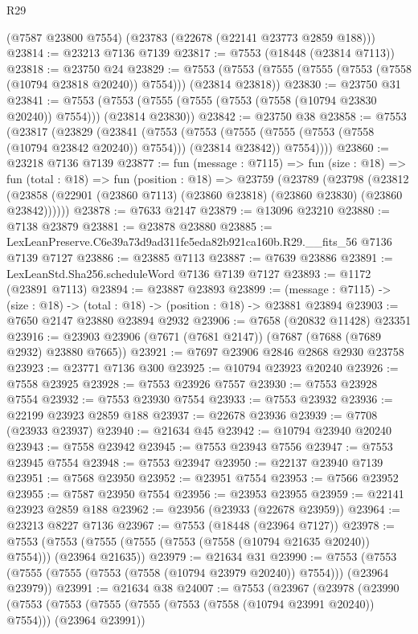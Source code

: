 \begin{lexlean}{R29}
\begin{coremodule}
    (@7587 @23800 @7554)
    (@23783 (@22678 (@22141 @23773 @2859 @188)))
@23814 := @23213 @7136 @7139
@23817 := @7553 (@18448 (@23814 @7113))
@23818 := @23750 @24
@23829 := @7553 (@7553 (@7555 (@7555 (@7553 (@7558 (@10794 @23818 @20240)) @7554))) (@23814 @23818))
@23830 := @23750 @31
@23841 := @7553 (@7553 (@7555 (@7555 (@7553 (@7558 (@10794 @23830 @20240)) @7554))) (@23814 @23830))
@23842 := @23750 @38
@23858 := @7553
    (@23817
      (@23829
        (@23841
          (@7553
            (@7553 (@7555 (@7555 (@7553 (@7558 (@10794 @23842 @20240)) @7554))) (@23814 @23842))
            @7554))))
@23860 := @23218 @7136 @7139
@23877 := fun (message : @7115) =>
  fun (size : @18) =>
  fun (total : @18) =>
  fun (position : @18) =>
  @23759
    (@23789
      (@23798
        (@23812 (@23858 (@22901 (@23860 @7113) (@23860 @23818) (@23860 @23830) (@23860 @23842))))))
@23878 := @7633 @2147
@23879 := @13096 @23210
@23880 := @7138 @23879
@23881 := @23878 @23880
@23885 := LexLeanPreserve.C6e39a73d9ad311fe5eda82b921ca160b.R29.__fits_56 @7136 @7139 @7127
@23886 := @23885 @7113
@23887 := @7639 @23886
@23891 := LexLeanStd.Sha256.scheduleWord @7136 @7139 @7127
@23893 := @1172 (@23891 @7113)
@23894 := @23887 @23893
@23899 := (message : @7115) -> (size : @18) -> (total : @18) -> (position : @18) -> @23881 @23894
@23903 := @7650 @2147 @23880 @23894 @2932
@23906 := @7658 (@20832 @11428) @23351
@23916 := @23903 @23906 (@7671 (@7681 @2147)) (@7687 (@7688 (@7689 @2932) @23880 @7665))
@23921 := @7697 @23906 @2846 @2868 @2930 @23758
@23923 := @23771 @7136 @300
@23925 := @10794 @23923 @20240
@23926 := @7558 @23925
@23928 := @7553 @23926 @7557
@23930 := @7553 @23928 @7554
@23932 := @7553 @23930 @7554
@23933 := @7553 @23932
@23936 := @22199 @23923 @2859 @188
@23937 := @22678 @23936
@23939 := @7708 (@23933 @23937)
@23940 := @21634 @45
@23942 := @10794 @23940 @20240
@23943 := @7558 @23942
@23945 := @7553 @23943 @7556
@23947 := @7553 @23945 @7554
@23948 := @7553 @23947
@23950 := @22137 @23940 @7139
@23951 := @7568 @23950
@23952 := @23951 @7554
@23953 := @7566 @23952
@23955 := @7587 @23950 @7554
@23956 := @23953 @23955
@23959 := @22141 @23923 @2859 @188
@23962 := @23956 (@23933 (@22678 @23959))
@23964 := @23213 @8227 @7136
@23967 := @7553 (@18448 (@23964 @7127))
@23978 := @7553 (@7553 (@7555 (@7555 (@7553 (@7558 (@10794 @21635 @20240)) @7554))) (@23964 @21635))
@23979 := @21634 @31
@23990 := @7553 (@7553 (@7555 (@7555 (@7553 (@7558 (@10794 @23979 @20240)) @7554))) (@23964 @23979))
@23991 := @21634 @38
@24007 := @7553
    (@23967
      (@23978
        (@23990
          (@7553
            (@7553 (@7555 (@7555 (@7553 (@7558 (@10794 @23991 @20240)) @7554))) (@23964 @23991))

\end{coremodule}
\end{lexlean}
